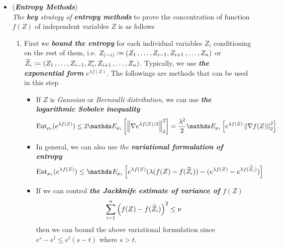 \documentclass[11pt]{article}
\begin{document}
\begin{itemize}
%

\item \begin{remark} (\textbf{\emph{Entropy Methods}})\\
\emph{The \textbf{key} strategy of \textbf{entropy methods}} to prove the concentration of function $f(Z)$ of independent variables $Z$  is as follows
\begin{enumerate}
\item First we \emph{\textbf{bound the entropy}} for each individual variables $Z_i$ conditioning on the rest of them, i.e. $Z_{(-i)} := (Z_1 \,{,}\ldots{,}\, Z_{i-1}, Z_{i+1} \,{,}\ldots{,}\, Z_n)$ or  $\widetilde{Z}_{i} := (Z_1 \,{,}\ldots{,}\, Z_{i-1}, Z_{i}', Z_{i+1} \,{,}\ldots{,}\, Z_n)$.  Typically, we use \emph{\textbf{the exponential form}} $e^{\lambda f(Z)}$. The followings are methods that can be used in this step
\begin{itemize}
\item If $Z$ is \emph{Gaussian} or \emph{Bernoulli distribution},  we can use \emph{\textbf{the logarithmic Sobolev inequality}} 
\begin{align*}
\text{Ent}_{\mu_i}(e^{ \lambda f(Z)}) &\le 2 \E{\mu_i}{\norm{\nabla e^{\lambda f(Z)/2}}{2}^2} = \frac{\lambda^2}{2}\E{\mu_i}{e^{\lambda f(Z)} \norm{\nabla f(Z)}{2}^2}.
\end{align*}
\item In general, we can also use \emph{the \textbf{variational formulation of entropy}} 
\begin{align*}
\text{Ent}_{\mu_i}(e^{\lambda f(Z)}) &\le  \E{\mu_i}{e^{\lambda f(Z)}(\lambda (f(Z) - f(\widetilde{Z}_{i})) - (e^{\lambda  f(Z)} - e^{\lambda f(\widetilde{Z}_{i})})}
\end{align*} 
\item If we can control \emph{\textbf{the Jackknife estimate of variance of $f(Z)$}}
\begin{align*}
\sum_{i=1}^{n}\left(f(Z) - f(\widetilde{Z}_{i})\right)^2 \le \nu
\end{align*} then we can bound the above variational formulation since $e^{s} - e^{t} \le e^{t}(s - t)$ where $s > t$.
\end{itemize}


\end{enumerate}
\end{remark}
\end{itemize}
\end{document}
